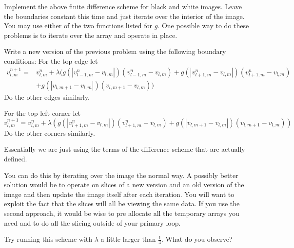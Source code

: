 \begin{problem}
Implement the above finite difference scheme for black and white images.
Leave the boundaries constant this time and just iterate over the interior of the image.
You may use either of the two functions listed for $g$.
One possible way to do these problems is to iterate over the array and operate in place.
\end{problem}

\begin{problem}
Write a new version of the previous problem using the following boundary conditions:
For the top edge let 
\begin{equation*}
\begin{split}
v_{l,m}^{n+1} =& v_{l,m}^n + \lambda (g(|v_{l-1,m}^n - v_{l,m}|)(v_{l-1,m}^n - v_{l,m}) + g(|v_{l+1,m}^n - v_{l,m}|)(v_{l+1,m}^n - v_{l,m}) \\
 &+ g(|v_{l,m+1} - v_{l,m}|)(v_{l,m+1} - v_{l,m}))
\end{split}
\end{equation*}
Do the other edges similarly.

For the top left corner let
\begin{equation*}
v_{l,m}^{n+1} = v_{l,m}^n + \lambda (g(|v_{l+1,m}^n - v_{l,m}|)(v_{l+1,m}^n - v_{l,m}) + g(|v_{l,m+1} - v_{l,m}|)(v_{l,m+1} - v_{l,m}))
\end{equation*}
Do the other corners similarly.

Essentially we are just using the terms of the difference scheme that are actually defined.

You can do this by iterating over the image the normal way.
A possibly better solution would be to operate on slices of a new version and an old version of the image and then update the image itself after each iteration.
You will want to exploit the fact that the slices will all be viewing the same data.
If you use the second approach, it would be wise to pre allocate all the temporary arrays you need and to do all the slicing outside of your primary loop.

Try running this scheme with $\lambda$ a little larger than $\frac{1}{4}$. What do you observe?
\end{problem}

